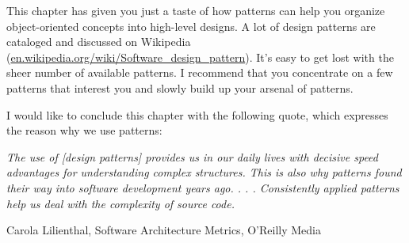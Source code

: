 This chapter has given you just a taste of how patterns can help you organize object-oriented concepts into high-level designs. A lot of design patterns are cataloged and discussed on Wikipedia (\url{en.wikipedia.org/wiki/Software_design_pattern}). It’s easy to get lost with the sheer number of available patterns. I recommend that you concentrate on a few patterns that interest you and slowly build up your arsenal of patterns.

I would like to conclude this chapter with the following quote, which expresses the reason why we use patterns:

\textit{
The use of [design patterns] provides us in our daily lives with decisive speed advantages for understanding complex structures. This is also why patterns found their way into software development years ago. . . . Consistently applied patterns help us deal with the complexity of source code.
}

\begin{flushright}
Carola Lilienthal, Software Architecture Metrics, O’Reilly Media
\end{flushright}
